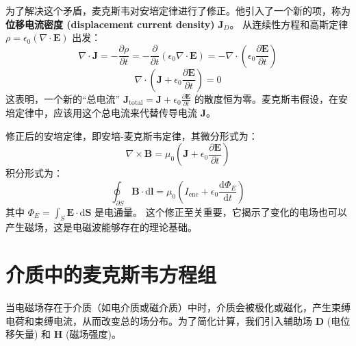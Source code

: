 \documentclass[fontset=none]{ctexart}
\begin{document}
为了解决这个矛盾，麦克斯韦对安培定律进行了修正。他引入了一个新的项，称为\textbf{位移电流密度 (displacement current density)} $\bm{J}_D$。
从连续性方程和高斯定律 $\rho = \epsilon_0 (\nabla \cdot \bm{E})$ 出发：
\begin{equation}
    \nabla \cdot \bm{J} = -\frac{\partial\rho}{\partial t} = -\frac{\partial}{\partial t} (\epsilon_0 \nabla \cdot \bm{E}) = -\nabla \cdot \left(\epsilon_0 \frac{\partial \bm{E}}{\partial t}\right)
\end{equation}
\begin{equation}
    \nabla \cdot \left(\bm{J} + \epsilon_0 \frac{\partial \bm{E}}{\partial t}\right) = 0
\end{equation}
这表明，一个新的“总电流” $\bm{J}_{\text{total}} = \bm{J} + \epsilon_0 \frac{\partial \bm{E}}{\partial t}$ 的散度恒为零。麦克斯韦假设，在安培定律中，应该用这个总电流来代替传导电流 $\bm{J}$。
\begin{definition}[安培-麦克斯韦定律]
    修正后的安培定律，即安培-麦克斯韦定律，其微分形式为：
    \begin{equation}
        \nabla \times \bm{B} = \mu_0 \left(\bm{J} + \epsilon_0 \frac{\partial \bm{E}}{\partial t}\right)
    \end{equation}
    积分形式为：
    \begin{equation}
        \oint_{\partial S} \bm{B} \cdot \mathrm{d}\bm{l} = \mu_0 \left(I_{\text{enc}} + \epsilon_0 \frac{\mathrm{d}\Phi_E}{\mathrm{d}t}\right)
    \end{equation}
    其中 $\Phi_E = \int_S \bm{E} \cdot \mathrm{d}\bm{S}$ 是电通量。
    这个修正至关重要，它揭示了变化的电场也可以产生磁场，这是电磁波能够存在的理论基础。
\end{definition}

\section{介质中的麦克斯韦方程组}
当电磁场存在于介质（如电介质或磁介质）中时，介质会被极化或磁化，产生束缚电荷和束缚电流，从而改变总的场分布。为了简化计算，我们引入辅助场 $\bm{D}$ (电位移矢量) 和 $\bm{H}$ (磁场强度)。
\end{document}
